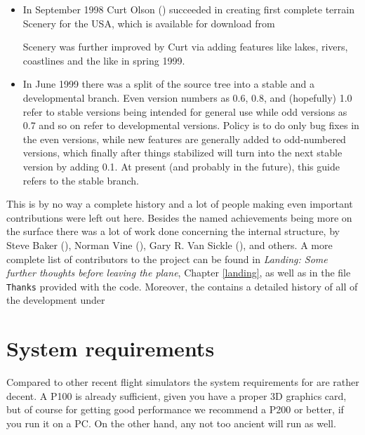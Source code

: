 \begin{itemize}
\item In September 1998 Curt Olson
() succeeded in creating first complete terrain Scenery for the
USA, which is available for download from


Scenery was further improved by Curt via adding features like lakes, rivers, coastlines
and the like in spring 1999.

\item In June 1999 there was a split of the source tree into a stable and a developmental
branch. Even version numbers as 0.6, 0.8, and (hopefully) 1.0 refer to stable versions
being intended for general use while odd versions as 0.7 and so on refer to developmental
versions. Policy is to do only bug fixes in the even versions, while new features are
generally added to odd-numbered versions, which finally after things stabilized will turn
into the next stable version by adding 0.1. At present (and probably in the future), this
guide refers to the stable branch. \label{branches}

\end{itemize}

\longpage

This is by no way a complete history and a lot of people making even important
contributions were left out here. Besides the named achievements being more on the
surface there was a lot of work done concerning the internal structure, by Steve
Baker (), Norman
Vine (), Gary R. Van Sickle (), and others. A more complete list of
contributors to the project can be found in \textit{Landing: Some further thoughts before
leaving the plane}, Chapter \ref{landing}, as well as in the file \texttt{Thanks}
provided with the code. Moreover, the  contains a detailed
history of all of the development under


\section{System requirements}
Compared to other recent flight simulators the system requirements
for \FlightGear are rather decent. A P100 is already sufficient,
given you have a proper 3D graphics card, but of course for
getting good performance we recommend a P200 or better, if you run
it on a PC. On the other hand, any not too ancient 
 will run \FlightGear as well.

